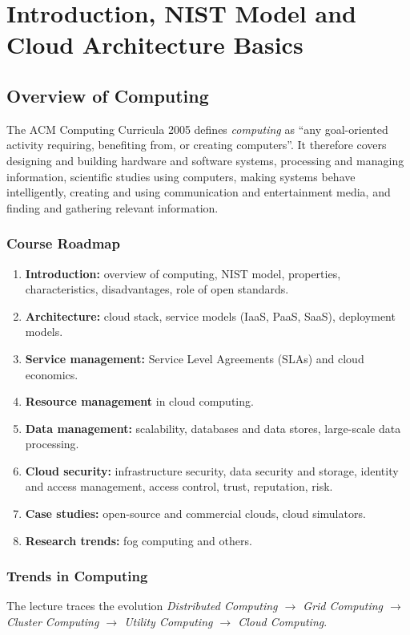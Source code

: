 \chapter{Introduction, NIST Model and Cloud Architecture Basics}

\section{Overview of Computing}
The ACM Computing Curricula 2005 defines \emph{computing} as ``any goal-oriented activity
requiring, benefiting from, or creating computers''. It therefore covers designing and
building hardware and software systems, processing and managing information, scientific
studies using computers, making systems behave intelligently, creating and using
communication and entertainment media, and finding and gathering relevant information.

\subsection{Course Roadmap}
\begin{enumerate}[leftmargin=*]
  \item \textbf{Introduction:} overview of computing, NIST model, properties, characteristics,
        disadvantages, role of open standards.
  \item \textbf{Architecture:} cloud stack, service models (IaaS, PaaS, SaaS), deployment models.
  \item \textbf{Service management:} Service Level Agreements (SLAs) and cloud economics.
  \item \textbf{Resource management} in cloud computing.
  \item \textbf{Data management:} scalability, databases and data stores, large-scale data
        processing.
  \item \textbf{Cloud security:} infrastructure security, data security and storage,
        identity and access management, access control, trust, reputation, risk.
  \item \textbf{Case studies:} open-source and commercial clouds, cloud simulators.
  \item \textbf{Research trends:} fog computing and others.
\end{enumerate}

\subsection{Trends in Computing}
The lecture traces the evolution \emph{Distributed Computing $\rightarrow$ Grid Computing
$\rightarrow$ Cluster Computing $\rightarrow$ Utility Computing $\rightarrow$ Cloud Computing}.

